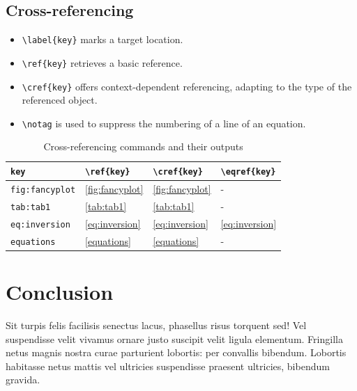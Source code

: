 \documentclass[
12pt,
a4paper,
twoside,
]{article}
\providecommand{\tightlist}{\setlength{\itemsep}{0pt}\setlength{\parskip}{0pt}}
\begin{document}
\subsection{Cross-referencing}\label{cross-referencing}

\begin{itemize}
\tightlist
\item
  \texttt{\textbackslash{}label\{key\}} marks a target location.
\item
  \texttt{\textbackslash{}ref\{key\}} retrieves a basic reference.
\item
  \texttt{\textbackslash{}cref\{key\}} offers context-dependent
  referencing, adapting to the type of the referenced object.
\item
  \texttt{\textbackslash{}notag} is used to suppress the numbering of a
  line of an equation.
\end{itemize}

\begin{table}[H]
\caption{Cross-referencing commands and their outputs}
\label{tab:references}
\centering
\fontsize{10}{12}\selectfont
\begin{tabular}{@{}llll@{}}
\toprule
\texttt{key} & \texttt{\textbackslash ref\{key\}} & \texttt{\textbackslash cref\{key\}} & \texttt{\textbackslash eqref\{key\}} \\
\midrule
\texttt{fig:fancyplot} & \ref{fig:fancyplot} & \cref{fig:fancyplot} & - \\
\texttt{tab:tab1} & \ref{tab:tab1} & \cref{tab:tab1} & - \\
\texttt{eq:inversion} & \ref{eq:inversion} & \cref{eq:inversion} & \eqref{eq:inversion} \\
\texttt{equations} & \ref{equations} & \cref{equations} & - \\
\bottomrule
\end{tabular}
\end{table}

\section{Conclusion}\label{conclusion}

Sit turpis felis facilisis senectus lacus, phasellus risus torquent sed!
Vel suspendisse velit vivamus ornare justo suscipit velit ligula
elementum. Fringilla netus magnis nostra curae parturient lobortis: per
convallis bibendum. Lobortis habitasse netus mattis vel ultricies
suspendisse praesent ultricies, bibendum gravida.
\end{document}
